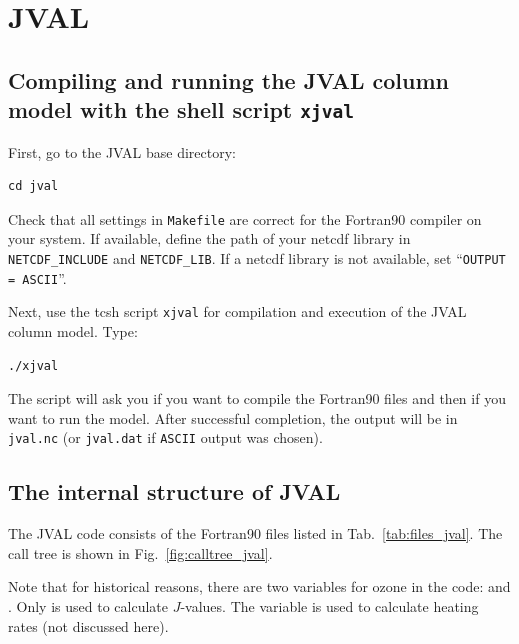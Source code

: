 \documentclass[a4paper,twoside]{article}
\begin{document}
\section{JVAL}

\subsection{Compiling and running the JVAL column model with the shell
  script {\tt xjval}}

First, go to the JVAL base directory:
\begin{verbatim}
cd jval
\end{verbatim}
Check that all settings in \verb|Makefile| are correct for the Fortran90
compiler on your system. If available, define the path of your netcdf
library in \verb|NETCDF_INCLUDE| and \verb|NETCDF_LIB|. If a netcdf
library is not available, set ``\verb|OUTPUT = ASCII|''. 

Next, use the tcsh script \verb|xjval| for compilation and execution of
the JVAL column model. Type:
\begin{verbatim}
./xjval
\end{verbatim}
The script will ask you if you want to compile the Fortran90 files and
then if you want to run the model. After successful completion, the
output will be in \verb|jval.nc| (or \verb|jval.dat| if \verb|ASCII|
output was chosen).

\subsection{The internal structure of JVAL}

The JVAL code consists of the Fortran90 files listed in
Tab.~\ref{tab:files_jval}. The call tree is shown in
Fig.~\ref{fig:calltree_jval}.

Note that for historical reasons, there are two variables for ozone in
the code:  and . Only  is used to
calculate $J$-values. The variable  is used to calculate
heating rates (not discussed here).
\end{document}
